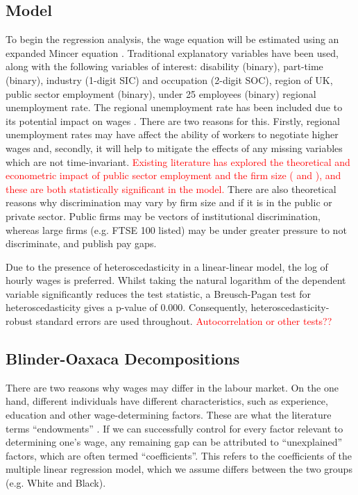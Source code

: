 \documentclass[class=article, crop=false]{standalone}
\begin{document}
\subsection{Model}
\label{sec:Model}
To begin the regression analysis, the wage equation will be estimated using an expanded Mincer equation \citep{MincerA}. Traditional explanatory variables have been used, along with the following variables of interest: disability (binary), part-time (binary), industry (1-digit SIC) and occupation (2-digit SOC), region of UK, public sector employment (binary), under 25 employees (binary) regional unemployment rate. The regional unemployment rate has been included due to its potential impact on wages \citep{Bell}. There are two reasons for this. Firstly, regional unemployment rates may have affect the ability of workers to negotiate higher wages and, secondly, it will help to mitigate the effects of any missing variables which are not time-invariant. \textcolor{red}{Existing literature has explored the theoretical and econometric impact of public sector employment and the firm size (\citet{Longhi} and \citet{Longhi3}), and these are both statistically significant in the model.} There are also theoretical reasons why discrimination may vary by firm size and if it is in the public or private sector. Public firms may be vectors of institutional discrimination, whereas large firms (e.g. FTSE 100 listed) may be under greater pressure to not discriminate, and publish pay gaps. %

Due to the presence of heteroscedasticity in a linear-linear model, the log of hourly wages is preferred. Whilst taking the natural logarithm of the dependent variable  significantly reduces the test statistic, a Breusch-Pagan test for heteroscedasticity gives a p-value of 0.000. Consequently, heteroscedasticity-robust standard errors are used throughout. \textcolor{red}{Autocorrelation or other tests??}

\subsection{Blinder-Oaxaca Decompositions}
\label{sec:B_O_Decomp}
There are two reasons why wages may differ in the labour market. On the one hand, different individuals have different characteristics, such as experience, education and other wage-determining factors. These are what the literature terms \enquote{endowments} \citep{Blinder}. If we can successfully control for every factor relevant to determining one's wage, any remaining gap can be attributed to \enquote{unexplained} factors, which are often termed \enquote{coefficients}. This refers to the coefficients of the multiple linear regression model, which we assume differs between the two groups (e.g. White and Black). %
\end{document}
